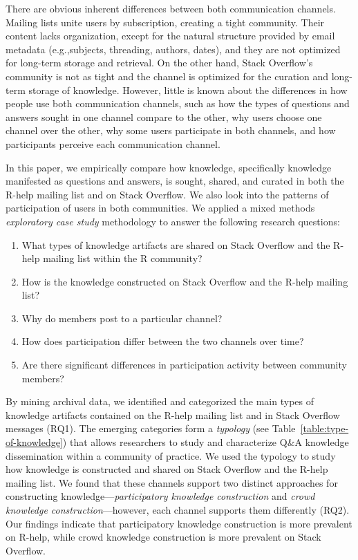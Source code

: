 \documentclass[smallextended]{svjour3}       %
\newcommand{\channel}{communication channel\xspace}
\newcommand{\channels}{communication channels\xspace}
\newcommand{\SO}{Stack Overflow\xspace}
\newcommand{\RH}{R-help\xspace}
\newcommand{\rqa}{What types of knowledge artifacts are shared on Stack Overflow and the R-help mailing list within the R community?}
\newcommand{\rqb}{How is the knowledge constructed on Stack Overflow and the R-help mailing list?}
\newcommand{\rqc}{Why do members post to a particular channel?}
\newcommand{\rqd}{How does participation differ between the two channels over time?}
\newcommand{\rqe}{Are there significant differences in participation activity between community members?}
\begin{document}
There are obvious inherent differences between both \channels. Mailing lists unite users by subscription, creating a tight community. Their content lacks organization, except for the natural structure provided by email metadata (e.g.,subjects, threading, authors, dates), and they are not optimized for long-term storage and retrieval. On the other hand, \SO's community is not as tight and the channel is optimized for the curation and long-term storage of knowledge. However, little is known about the differences in how people use both \channels, such as how the types of questions and answers sought in one channel compare to the other, why users choose one channel over the other, why some users participate in both channels, and how participants perceive each \channel.



In this paper, we empirically compare how
knowledge, specifically knowledge manifested as questions and answers,
is sought, shared, and curated in both the \RH mailing list and on
\SO.  We also look into the patterns of participation of users in both
communities. 
We applied a mixed methods \textit{exploratory case study}
methodology to answer the following research questions:

\begin{enumerate}[label=\bfseries{RQ\arabic*.},itemsep=3pt, topsep=2pt, leftmargin=3em, parsep=0pt]
\item \rqa
\item \rqb
\item \rqc
\item \rqd
\item \rqe
\end{enumerate}

By mining archival data, we identified and categorized the main types
of knowledge artifacts contained on the \RH mailing list and in \SO
messages (RQ1). The emerging categories form a \textit{typology} (see
Table~\ref{table:type-of-knowledge}) that
allows researchers to study and characterize Q\&A knowledge
dissemination within a community of practice. We used the typology to
study how knowledge is constructed and shared on \SO and the \RH
mailing list. We found that these channels support two distinct
approaches for constructing knowledge---\textit{participatory
  knowledge construction} and \textit{crowd knowledge
  construction}---however, each channel supports them differently
(RQ2). Our findings indicate that participatory knowledge construction
is more prevalent on \RH, while crowd knowledge construction is more
prevalent on \SO.
\end{document}
